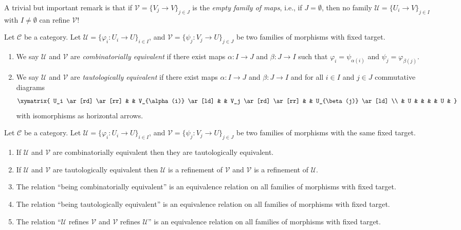 \noindent
A trivial but important remark is that if
$\mathcal{V} = \{V_j \to V\}_{j \in J}$
is the {\it empty family of maps}, i.e., if $J = \emptyset$, then no
family $\mathcal{U} = \{U_i \to V\}_{j\in I}$ with $I \not = \emptyset$
can refine $\mathcal{V}$!

\begin{definition}
\label{definition-combinatorial-tautological}
Let $\mathcal{C}$ be a category.
Let $\mathcal{U} = \{\varphi_i : U_i \to U\}_{i\in I}$, and
$\mathcal{V} = \{\psi_j : V_j \to U\}_{j\in J}$ be two families of morphisms
with fixed target.
\begin{enumerate}
\item  We say $\mathcal{U}$ and $\mathcal{V}$ are
{\it combinatorially equivalent}
if there exist maps
$\alpha : I \to J$ and $\beta : J\to I$ such that
$\varphi_i = \psi_{\alpha(i)}$ and $\psi_j = \varphi_{\beta(j)}$.
\item We say $\mathcal{U}$ and $\mathcal{V}$ are
{\it tautologically equivalent} if there exist maps
$\alpha : I \to J$ and $\beta : J\to I$ and
for all $i\in I$ and $j \in J$ commutative diagrams
$$
\xymatrix{
U_i \ar[rd] \ar[rr] & &
V_{\alpha(i)} \ar[ld] & &
V_j \ar[rd] \ar[rr] & &
U_{\beta(j)} \ar[ld] \\
&
U & & & &
U &
}
$$
with isomorphisms as horizontal arrows.
\end{enumerate}
\end{definition}

\begin{lemma}
\label{lemma-tautological-combinatorial}
Let $\mathcal{C}$ be a category.
Let $\mathcal{U} = \{\varphi_i : U_i \to U\}_{i\in I}$, and
$\mathcal{V} = \{\psi_j : V_j \to U\}_{j\in J}$ be two families of morphisms
with the same fixed target.
\begin{enumerate}
\item If $\mathcal{U}$ and $\mathcal{V}$ are combinatorially equivalent
then they are tautologically equivalent.
\item If $\mathcal{U}$ and $\mathcal{V}$ are tautologically equivalent
then $\mathcal{U}$ is a refinement of $\mathcal{V}$ and
$\mathcal{V}$ is a refinement of $\mathcal{U}$.
\item The relation ``being combinatorially equivalent'' is an
equivalence relation on all families of morphisms with fixed target.
\item The relation ``being tautologically equivalent'' is an
equivalence relation on all families of morphisms with fixed target.
\item The relation ``$\mathcal{U}$ refines $\mathcal{V}$ and
$\mathcal{V}$ refines $\mathcal{U}$'' is an equivalence relation on
all families of morphisms with fixed target.
\end{enumerate}
\end{lemma}

